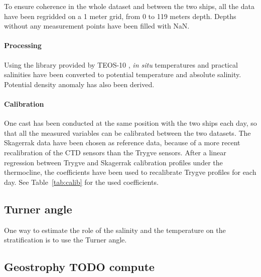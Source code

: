 \documentclass[12pt,a4paper]{article}
\begin{document}
To ensure coherence in the whole dataset and between the two ships,
all the data have been regridded on a 1 meter grid, from 0 to 119 meters depth.
Depths without any measurement points have been filled with NaN.

\paragraph{Processing}
Using the library provided by TEOS-10 \citep{gsw}, {\it in situ} temperatures and practical
salinities have been converted to potential temperature and absolute salinity.
Potential density anomaly has also been derived.

\paragraph{Calibration}
One cast has been conducted at the same position with the two ships each day,
so that all the measured variables can be calibrated between the two datasets.
The Skagerrak data have been chosen as reference data, because of a more
recent recalibration of the CTD sensors than the Trygve sensors.
After a linear regression between Trygve and Skagerrak calibration profiles
under the thermocline, the coefficients have been used to recalibrate
Trygve profiles for each day.
See Table~\ref{tab:calib} for the used coefficients.


\subsection{Turner angle}
One way to estimate the role of the salinity and the temperature on the stratification
is to use the Turner angle.
\citep{ruddick1983, johnson2012}

\subsection{Geostrophy TODO compute}
\end{document}
